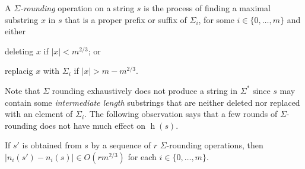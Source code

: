 \documentclass[kpfonts]{patmorin}
\DeclareMathOperator{\hist}{h}
\begin{document}
A \emph{$\Sigma$-rounding} operation on a string $s$ is the process of finding a maximal substring $x$ in $s$ that is a proper prefix or suffix of $\Sigma_i$, for some $i\in\{0,\ldots,m\}$ and either
\begin{inparaenum}[(i)]
    \item deleting $x$ if $|x|<m^{2/3}$; or
    \item replacig $x$ with $\Sigma_i$ if $|x|>m-m^{2/3}$.
\end{inparaenum}
Note that $\Sigma$ rounding exhaustively does not produce a string in $\Sigma^*$ since $s$ may contain some \emph{intermediate length} substrings that are neither deleted nor replaced with an element of $\Sigma_i$. The following observation says that a few rounds of $\Sigma$-rounding does not have much effect on $\hist(s)$.
\begin{obs}
    If $s'$ is obtained from $s$ by a sequence of $r$ $\Sigma$-rounding operations, then $|n_i(s')-n_i(s)|\in O(r m^{2/3})$ for each $i\in\{0,\ldots,m\}$.
\end{obs}
\end{document}
